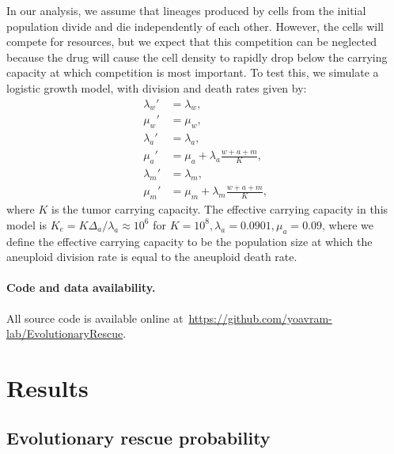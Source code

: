 \documentclass[12pt]{extarticle}
\begin{document}
In our analysis, we assume that lineages produced by cells from the initial population divide and die independently of each other.
However, the cells will compete for resources, but we expect that this competition can be neglected because the drug will cause the cell density to rapidly drop below the carrying capacity at which competition is most important.
To test this, we simulate a logistic growth model, with division and death rates given by:
\begin{align*}
\lambda_w' &= \lambda_w , \\
\mu_w' &= \mu_w ,\\
\lambda_a' &= \lambda_a ,\\ 
\mu_a' &= \mu_a + \lambda_a\frac{w+a+m}{K} ,\\
\lambda_m' &= \lambda_m ,\\ 
\mu_m' &= \mu_m + \lambda_m\frac{w+a+m}{K} ,
\end{align*}
where $K$ is the tumor carrying capacity. 
The effective carrying capacity in this model is $K_e=K\Delta_a/\lambda_a\approx10^6$ for $K=10^8, \lambda_a=0.0901,\mu_a=0.09$, where we define the effective carrying capacity to be the population size at which the aneuploid division rate is equal to the aneuploid death rate. 


\paragraph{Code and data availability.} All source code is available online at~\url{https://github.com/yoavram-lab/EvolutionaryRescue}.


\section*{Results}


\subsection*{Evolutionary rescue probability}
\end{document}
